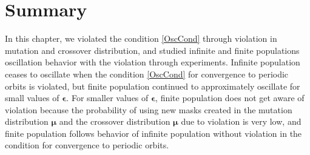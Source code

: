 \section{Summary}
In this chapter, we violated the condition \ref{OscCond} through violation in mutation and crossover distribution, and 
studied infinite and finite populations oscillation behavior with the violation through experiments. 
Infinite population ceases to oscillate when the condition \ref{OscCond} for convergence to 
periodic orbits is violated, but finite population continued to approximately oscillate for small values of $\bm{\epsilon}$. 
For smaller values of $\bm{\epsilon}$, finite population does not get aware of violation because the probability of using 
new masks created in the mutation distribution $\bm{\mu}$ and the crossover distribution $\bm{\mu}$ due to violation is very low, and 
finite population follows behavior of infinite population without violation in the condition for convergence to 
periodic orbits.





 
